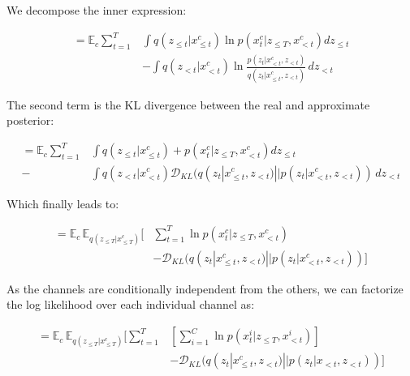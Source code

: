 We decompose the inner expression:

\begin{equation} 
\begin{aligned}
\displaystyle
= \mathbb{E}_c \sum^T_{t=1} & \int \mathit{q}(z_{\leq t}|x^c_{\leq t}) \ln \mathit{p}(x^c_t |z_{\leq T}, x^c_{< t}) dz_{\leq t} \\
&- \int \mathit{q}(z_{< t}|x^c_{< t}) \ln \frac{\mathit{p}(z_t |x^c_{< t}, z_{< t})}{\mathit{q}(z_t |x^c_{\leq t}, z_{< t})} \,dz_{< t}
\end{aligned}
\end{equation}

The second term is the KL divergence between the real and approximate posterior:

\begin{equation} 
\begin{aligned}
\displaystyle
= \mathbb{E}_c \sum^T_{t=1}  & \int \mathit{q}(z_{\leq t}|x^c_{\leq t}) + \mathit{p}(x^c_t |z_{\leq T}, x^c_{< t}) dz_{\leq t} \\
- & \int \mathit{q}(z_{< t}|x^c_{< t}) \mathcal{D}_{KL}(\mathit{q}(z_t |x^c_{\leq t}, z_{< t}) || \mathit{p}(z_t |x^c_{< t}, z_{< t})) \,dz_{< t}
\end{aligned}
\end{equation}

Which finally leads to:

\begin{equation} 
\begin{aligned}
\displaystyle
= \mathbb{E}_c \,\mathbb{E}_{\mathit{q}(z_{\leq T}|x^c_{\leq T})}  \Big[ & \sum^T_{t=1} \ln \mathit{p}(x^c_t |z_{\leq T}, x^c_{< t}) \\
&- \mathcal{D}_{KL}(\mathit{q}(z_t |x^c_{\leq t}, z_{< t}) || \mathit{p}(z_t |x^c_{< t}, z_{< t})) \Big]
\end{aligned}
\end{equation}

As the channels are conditionally independent from the others, we can factorize the log likelihood  over each individual channel as:

\begin{equation} 
\begin{aligned} \label{rnn:eq:finalopt}
\displaystyle
= \mathbb{E}_c \,\mathbb{E}_{\mathit{q}(z_{\leq T}|x^c_{\leq T})}  \Big[ \sum^T_{t=1} & [ \sum^C_{i=1} \ln \mathit{p}(x^i_t |z_{\leq T}, x^i_{< t}) ] \\
&- \mathcal{D}_{KL}( \mathit{q}(z_t |x^c_{\leq t}, z_{< t}) || \mathit{p}(z_t |x_{< t}, z_{< t})) \Big]
\end{aligned}
\end{equation}

